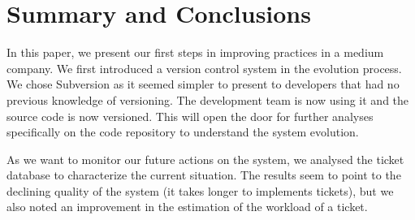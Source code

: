 \documentclass[10pt,conference]{IEEEtran}
\begin{document}


\section{Summary and Conclusions}
\label{sec:conclusion}

In this paper, we present our first steps in improving practices in a medium company. We first introduced a version control system in the evolution process.
We chose Subversion as it seemed simpler to present to developers that had no previous knowledge of versioning.
The development team is now using it and the source code is now versioned.
This will open the door for further analyses specifically on the code repository to understand the system evolution. 

As we want to monitor our future actions on the system, we analysed the ticket database to characterize the current situation.
The results seem to point to the declining quality of the system (it takes longer to implements tickets), but we also noted an improvement in the estimation of the workload of a ticket.

%


\vspace{12pt}
\end{document}
